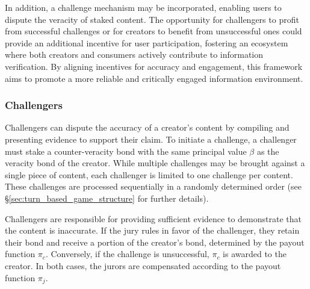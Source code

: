 \documentclass{article}
\begin{document}
In addition, a challenge mechanism may be incorporated, enabling users to dispute the veracity of staked content. The opportunity for challengers to profit from successful challenges or for creators to benefit from unsuccessful ones could provide an additional incentive for user participation, fostering an ecosystem where both creators and consumers actively contribute to information verification. By aligning incentives for accuracy and engagement, this framework aims to promote a more reliable and critically engaged information environment.

\subsubsection{Challengers} 

Challengers can dispute the accuracy of a creator’s content by compiling and presenting evidence to support their claim. To initiate a challenge, a challenger must stake a counter-veracity bond with the same principal value $\beta$ as the veracity bond of the creator. While multiple challenges may be brought against a single piece of content, each challenger is limited to one challenge per content. These challenges are processed sequentially in a randomly determined order (see \S\ref{sec:turn_based_game_structure} for further details).  

Challengers are responsible for providing sufficient evidence to demonstrate that the content is inaccurate. If the jury rules in favor of the challenger, they retain their bond and receive a portion of the creator’s bond, determined by the payout function $\pi_c$. Conversely, if the challenge is unsuccessful, $\pi_c$ is awarded to the creator. In both cases, the jurors are compensated according to the payout function $\pi_j$.


\end{document}
